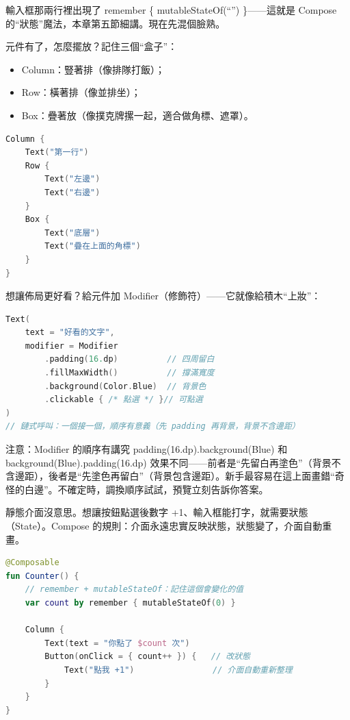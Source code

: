 輸入框那兩行裡出現了 remember \{ mutableStateOf(“”) \}——這就是 Compose 的“狀態”魔法，本章第五節細講。現在先混個臉熟。


元件有了，怎麼擺放？記住三個“盒子”：

\begin{itemize}
  \item Column：豎著排（像排隊打飯）；
  \item Row：橫著排（像並排坐）；
  \item Box：疊著放（像撲克牌摞一起，適合做角標、遮罩）。
\end{itemize}

\begin{lstlisting}[language=Kotlin]
Column {
    Text("第一行")
    Row {
        Text("左邊")
        Text("右邊")
    }
    Box {
        Text("底層")
        Text("疊在上面的角標")
    }
}
\end{lstlisting}

想讓佈局更好看？給元件加 Modifier（修飾符）——它就像給積木“上妝”：

\begin{lstlisting}[language=Kotlin]
Text(
    text = "好看的文字",
    modifier = Modifier
        .padding(16.dp)          // 四周留白
        .fillMaxWidth()          // 撐滿寬度
        .background(Color.Blue)  // 背景色
        .clickable { /* 點選 */ }// 可點選
)
// 鏈式呼叫：一個接一個，順序有意義（先 padding 再背景，背景不含邊距）
\end{lstlisting}

\begin{tcbwarn}{注意：Modifier 的順序有講究}
padding(16.dp).background(Blue) 和 background(Blue).padding(16.dp) 效果不同——前者是“先留白再塗色”（背景不含邊距），後者是“先塗色再留白”（背景包含邊距）。新手最容易在這上面畫錯“奇怪的白邊”。不確定時，調換順序試試，預覽立刻告訴你答案。

\end{tcbwarn}


靜態介面沒意思。想讓按鈕點選後數字 +1、輸入框能打字，就需要狀態（State）。Compose 的規則：介面永遠忠實反映狀態，狀態變了，介面自動重畫。

\begin{lstlisting}[language=Kotlin]
@Composable
fun Counter() {
    // remember + mutableStateOf：記住這個會變化的值
    var count by remember { mutableStateOf(0) }

    Column {
        Text(text = "你點了 $count 次")
        Button(onClick = { count++ }) {   // 改狀態
            Text("點我 +1")                // 介面自動重新整理
        }
    }
}
\end{lstlisting}

